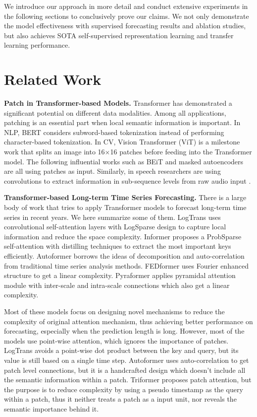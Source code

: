 \documentclass{article} \usepackage{iclr2023_conference,times}
\begin{document}
We introduce our approach in more detail and conduct extensive experiments in the following sections to conclusively prove our claims. We not only demonstrate the model effectiveness with supervised forecasting results and ablation studies, but also achieves SOTA self-supervised representation learning and transfer learning performance.



\section{Related Work}
\label{gen_inst}

\textbf{Patch in Transformer-based Models.}  Transformer \citep{transformer} has demonstrated a significant potential on different data modalities. Among all applications, patching is an essential part when local semantic information is important. In NLP, BERT \citep{bert} considers subword-based tokenization \citep{wordpiece} instead of performing character-based tokenization. In CV, Vision Transformer (ViT) \citep{vit} is a milestone work that splits an image into 16$\times$16 patches before feeding into the Transformer model. The following influential works such as BEiT \citep{beit} and masked autoencoders \citep{mae} are all using patches as input. Similarly, in speech researchers are using convolutions to extract information in sub-sequence levels from raw audio input \citep{wav2vec2,hubert}. 

\textbf{Transformer-based Long-term Time Series Forecasting.} There is a large body of work that tries to apply Transformer models to forecast long-term time series in recent years. We here summarize some of them. LogTrans \citep{logtrans} uses convolutional self-attention layers with LogSparse design to capture local information and reduce the space complexity. Informer \citep{informer} proposes a ProbSparse self-attention with distilling techniques to extract the most important keys efficiently. Autoformer \citep{autoformer} borrows the ideas of decomposition and auto-correlation from traditional time series analysis methods. FEDformer \citep{fedformer} uses Fourier enhanced structure to get a linear complexity. Pyraformer \citep{pyraformer} applies pyramidal attention module with inter-scale and intra-scale connections which also get a linear complexity.

Most of these models focus on designing novel mechanisms to reduce the complexity of original attention mechanism, thus achieving better performance on forecasting, especially when the prediction length is long. However, most of the models use point-wise attention, which ignores the importance of patches. LogTrans \citep{logtrans} avoids a point-wise dot product between the key and query, but its value is still based on a single time step. Autoformer \citep{autoformer} uses auto-correlation to get patch level connections, but it is a handcrafted design which doesn't include all the semantic information within a patch. Triformer \citep{triformer} proposes patch attention, but the purpose is to reduce complexity by using a pseudo timestamp as the query within a patch, thus it neither treats a patch as a input unit, nor reveals the semantic importance behind it.
\end{document}
